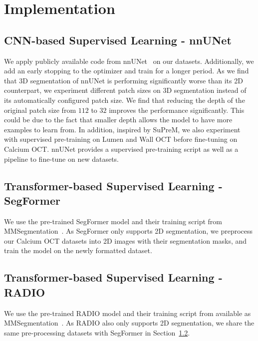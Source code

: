 \documentclass[a4paper,11pt,oneside]{report}
\begin{document}
\chapter{Implementation}


\section{CNN-based Supervised Learning - nnUNet}
We apply publicly available code from nnUNet~\cite{Isensee2020} on our datasets. Additionally, we add an early stopping to the optimizer and train for a longer period. As we find that 3D segmentation of nnUNet is performing significantly worse than its 2D counterpart, we experiment different patch sizes on 3D segmentation instead of its automatically configured patch size. We find that reducing the depth of the original patch size from $112$ to $32$ improves the performance significantly. This could be due to the fact that smaller depth allows the model to have more examples to learn from. In addition, inspired by SuPreM, we also experiment with supervised pre-training on Lumen and Wall OCT before fine-tuning on Calcium OCT. nnUNet provides a supervised pre-training script as well as a pipeline to fine-tune on new datasets.

\section{Transformer-based Supervised Learning - SegFormer}\label{sec:implementation:segformer}
We use the pre-trained SegFormer model and their training script from MMSegmentation~\cite{mmseg2020}. As SegFormer only supports 2D segmentation, we preprocess our Calcium OCT datasets into 2D images with their segmentation masks, and train the model on the newly formatted dataset.

\section{Transformer-based Supervised Learning - RADIO}
We use the pre-trained RADIO model and their training script from available as MMSegmentation~\cite{mmseg2020}. As RADIO also only supports 2D segmentation, we share the same pre-processing datasets with SegFormer in Section~\ref{sec:implementation:segformer}.
\end{document}
